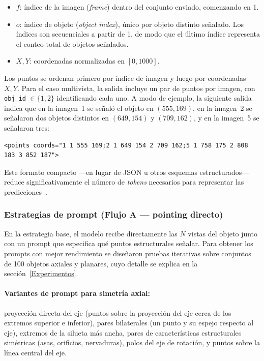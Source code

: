 \begin{itemize}
    \item $f$: índice de la imagen (\textit{frame}) dentro del conjunto enviado,
          comenzando en 1.
    \item $o$: índice de objeto (\textit{object index}), único por objeto distinto
          señalado. Los índices son secuenciales a partir de 1, de modo que el
          último índice representa el conteo total de objetos señalados.
    \item $X, Y$: coordenadas normalizadas en $[0, 1000]$.
\end{itemize}

Los puntos se ordenan primero por índice de imagen y luego por coordenadas $X, Y$.
Para el caso multivista, la salida incluye un par de puntos por imagen, con
\texttt{obj\_id} $\in \{1, 2\}$ identificando cada uno. A modo de ejemplo, la
siguiente salida indica que en la imagen~1 se señaló el objeto en $(555, 169)$,
en la imagen~2 se señalaron dos objetos distintos en $(649, 154)$ y $(709, 162)$,
y en la imagen~5 se señalaron tres:

\begin{verbatim}
<points coords="1 1 555 169;2 1 649 154 2 709 162;5 1 758 175 2 808 183 3 852 187">
\end{verbatim}

Este formato compacto —en lugar de JSON u otros esquemas estructurados— reduce
significativamente el número de \textit{tokens} necesarios para representar las
predicciones~\cite{clark2026molmo2}.

\subsubsection{Estrategias de prompt (Flujo A — pointing directo)}

En la estrategia base, el modelo recibe directamente las $N$ vistas del objeto
junto con un prompt que especifica qué puntos estructurales señalar. Para obtener
los prompts con mejor rendimiento se diseñaron pruebas iterativas sobre conjuntos
de 100 objetos axiales y planares, cuyo detalle se explica en la
sección~\ref{Experimentos}.

\paragraph{Variantes de prompt para simetría axial:}
proyección directa del eje (puntos sobre la proyección del eje cerca de los
extremos superior e inferior), pares bilaterales (un punto y su espejo respecto
al eje), extremos de la silueta más ancha, pares de características estructurales
simétricas (asas, orificios, nervaduras), polos del eje de rotación, y puntos
sobre la línea central del eje.

